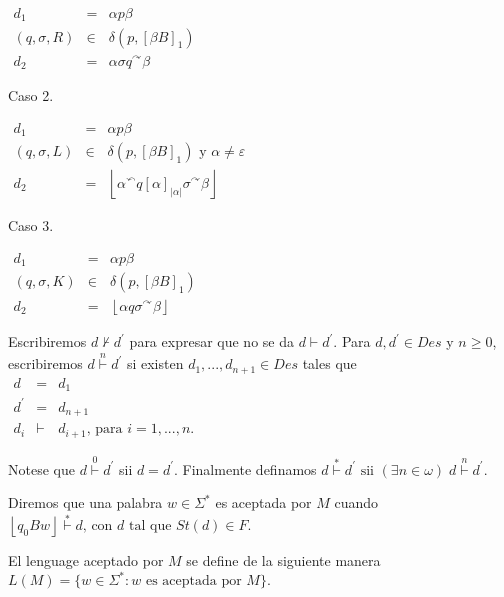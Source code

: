 \(\displaystyle \begin{array}{rcl} d_{1} & =& \alpha p\beta \\ (q,\sigma ,R) & \in & \delta \left( p,\left[ \beta B\right] _{1}\right) \\ d_{2} & =& \alpha \sigma q^{\curvearrowright }\beta \end{array} \)

Caso 2.

\(\displaystyle \begin{array}{rcl} d_{1} & =& \alpha p\beta \\ (q,\sigma ,L) & \in & \delta \left( p,\left[ \beta B\right] _{1}\right) \text{ y }\alpha \neq \varepsilon \\ d_{2} & =& \left\lfloor \alpha ^{\curvearrowleft }q\left[ \alpha \right] _{\left\vert \alpha \right\vert }\sigma ^{\curvearrowright }\beta \right\rfloor \end{array} \)

Caso 3.

\(\displaystyle \begin{array}{rcl} d_{1} & =& \alpha p\beta \\ (q,\sigma ,K) & \in & \delta (p,\left[ \beta B\right] _{1}) \\ d_{2} & =& \left\lfloor \alpha q\sigma ^{\curvearrowright }\beta \right\rfloor \end{array} \)

Escribiremos \(d\nvdash d^{\prime }\) para expresar que no se da \(d\vdash d^{\prime }\). Para \(d,d^{\prime }\in Des\) y \(n\geq 0\), escribiremos \(d \overset{n}{\vdash }d^{\prime }\) si existen \(d_{1},...,d_{n+1}\in Des\) tales que
\(\displaystyle \begin{array}{rcl} d & =& d_{1} \\ d^{\prime } & =& d_{n+1} \\ d_{i} & \vdash & d_{i+1}\text{, para }i=1,...,n. \end{array} \)

Notese que \(d\overset{0}{\vdash }d^{\prime }\) sii \(d=d^{\prime }\). Finalmente definamos
\(\displaystyle d\overset{\ast }{\vdash }d^{\prime }\text{ sii }(\exists n\in \omega )\;d \overset{n}{\vdash }d^{\prime }\text{.} \)

Diremos que una palabra \(w\in \Sigma ^{\ast }\) es aceptada por \(M\) cuando
\(\displaystyle \left\lfloor q_{0}Bw\right\rfloor \overset{\ast }{\vdash }d\text{, con }d \text{ tal que }St(d)\in F. \)

El lenguage aceptado por \(M\) se define de la siguiente manera
\(\displaystyle L(M)=\{w\in \Sigma ^{\ast }:w\text{ es aceptada por }M\}\text{.} \)

